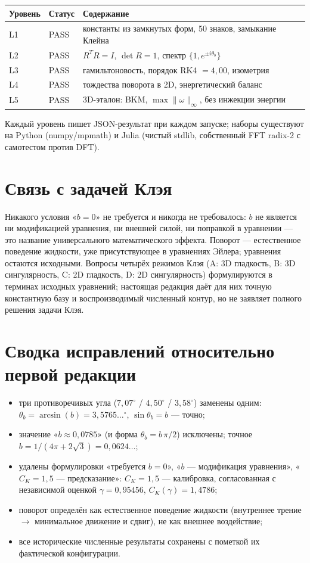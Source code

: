 \documentclass[12pt]{article}
\begin{document}
\begin{table}[h]
\centering
\begin{tabular}{llp{7.2cm}}
\toprule
Уровень & Статус & Содержание \\
\midrule
L1 & PASS & константы из замкнутых форм, 50 знаков, замыкание Клейна \\
L2 & PASS & $R^{T}R=I$, $\det R=1$, спектр $\{1,e^{\pm i\theta_b}\}$ \\
L3 & PASS & гамильтоновость, порядок RK4 $=4{,}00$, изометрия \\
L4 & PASS & тождества поворота в 2D, энергетический баланс \\
L5 & PASS & 3D-эталон: BKM, $\max\|\omega\|_\infty$, без инжекции энергии \\
\bottomrule
\end{tabular}
\end{table}

Каждый уровень пишет JSON-результат при каждом запуске; наборы существуют
на Python (numpy/mpmath) и Julia (чистый stdlib, собственный FFT radix-2
с самотестом против DFT).

\section{Связь с задачей Клэя}

Никакого условия «$b=0$» не требуется и никогда не требовалось: $b$ не является
ни модификацией уравнения, ни внешней силой, ни поправкой в уравнении ---
это название универсального математического эффекта. Поворот --- естественное
поведение жидкости, уже присутствующее в уравнениях Эйлера; уравнения остаются
исходными. Вопросы четырёх режимов Клэя (A: 3D гладкость, B: 3D сингулярность,
C: 2D гладкость, D: 2D сингулярность) формулируются в терминах исходных уравнений;
настоящая редакция даёт для них точную константную базу и воспроизводимый
численный контур, но не заявляет полного решения задачи Клэя.

\section{Сводка исправлений относительно первой редакции}

\begin{itemize}
\item три противоречивых угла ($7{,}07^\circ$ / $4{,}50^\circ$ / $3{,}58^\circ$)
заменены одним: $\theta_b=\arcsin(b)=3{,}5765\ldots^\circ$, $\sin\theta_b=b$ --- точно;
\item значение «$b\approx0{,}0785$» (и форма $\theta_b=b\,\pi/2$) исключены;
точное $b=1/(4\pi+2\sqrt3)=0{,}0624\ldots$;
\item удалены формулировки «требуется $b=0$», «$b$ --- модификация уравнения»,
«$C_K=1{,}5$ --- предсказание»: $C_K=1{,}5$ --- калибровка, согласованная с
независимой оценкой $\gamma=0{,}95456$, $C_K(\gamma)=1{,}4786$;
\item поворот определён как естественное поведение жидкости (внутреннее трение
$\to$ минимальное движение и сдвиг), не как внешнее воздействие;
\item все исторические численные результаты сохранены с пометкой их фактической
конфигурации.
\end{itemize}
\end{document}
